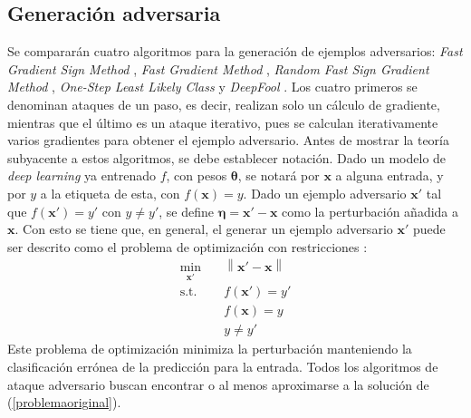 \documentclass[conference]{IEEEtran}
\newcommand{\norm}[1]{\left\lVert#1\right\rVert}
\begin{document}
\subsection{Generación adversaria}
Se compararán cuatro algoritmos para la generación de ejemplos adversarios: \textit{Fast Gradient Sign Method} \cite{goodfellow2014}, \textit{Fast Gradient Method} \cite{kurakin2016}, \textit{Random Fast Sign Gradient Method} \cite{tramer2017}, \textit{One-Step Least Likely Class} \cite{kurakin2016} y \textit{DeepFool} \cite{deepfool}. Los cuatro primeros se denominan ataques de un paso, es decir, realizan solo un cálculo de gradiente, mientras que el último es un ataque iterativo, pues se calculan iterativamente varios gradientes \cite{kurakin2016} para obtener el ejemplo adversario. Antes de mostrar la teoría subyacente a estos algoritmos, se debe establecer notación. Dado un modelo de \textit{deep learning} ya entrenado $f$, con pesos $\bm{\theta}$, se notará por $\bm{x}$ a alguna entrada, y por $y$ a la etiqueta de esta, con $f(\bm{x})=y$. Dado un ejemplo adversario $\bm{x}'$ tal que $f(\bm{x}')=y'$ con $y \neq y'$, se define $\bm{\eta} = \bm{x}' - \bm{x}$ como la perturbación añadida a $\bm{x}$. Con esto se tiene que, en general, el generar un ejemplo adversario $\bm{x}'$ puede ser descrito como el problema de optimización con restricciones \cite{yuan2017}:
\begin{equation}\label{problemaoriginal}
	\begin{aligned}
		\min_{\bm{x}'} \quad&\norm{\bm{x'}-\bm{x}} \\
	\text{s.t.} \quad &f(\bm{x'})=y'\\
	&f(\bm{x})=y \\
	&y \neq y'
\end{aligned}
\end{equation}
Este problema de optimización minimiza la perturbación manteniendo la clasificación errónea de la predicción para la entrada. Todos los algoritmos de ataque adversario buscan encontrar o al menos aproximarse a la solución de (\ref{problemaoriginal}). 
\end{document}
